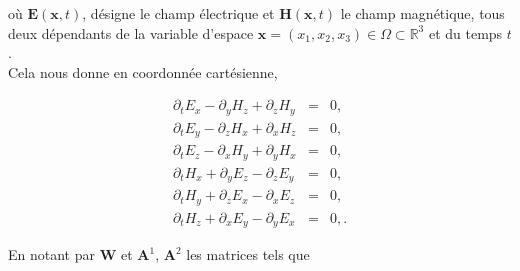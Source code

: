 \documentclass[a4paper,oneside,10pt]{report}
\begin{document}
où $\mathbf{E}(\mathbf{x},t)$, désigne le champ électrique et $\mathbf{H}(\mathbf{x},t)$ le champ magnétique, tous deux dépendants de la variable d'espace $\mathbf{x}=(x_1,x_2,x_3)\in \Omega \subset \mathbb{R}^3$ et du temps $t$.\\


Cela nous donne en coordonnée cartésienne,

\begin{eqnarray}
\partial_t E_x - \partial_y H_z + \partial_z H_y    &=& 0, \label{eq:3a}\\
\partial_t E_y - \partial_z H_x + \partial_x H_z    &=& 0, \label{eq:3b}\\
\partial_t E_z - \partial_x H_y + \partial_y H_x    &=& 0, \label{eq:3c}\\
\partial_t H_x + \partial_y E_z - \partial_z E_y    &=& 0, \label{eq:3d}\\
\partial_t H_y + \partial_z E_x - \partial_x E_z    &=& 0, \label{eq:3e}\\
\partial_t H_z + \partial_x E_y - \partial_y E_x    &=& 0, \label{eq:3f}.
\end{eqnarray}


En notant par $\mathbf{W}$ et $\mathbf{A}^1$, $\mathbf{A}^2$ les matrices tels que
\end{document}
